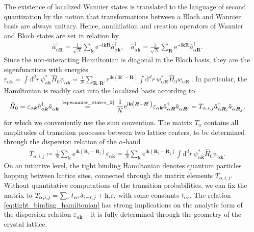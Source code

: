 \documentclass{svmono}
\def\ri{\mathrm i}
\def\re{\mathrm e}
\def\rd{\mathrm d}
\def\hc{{\rm h.c.}}
\def\pdag{{\vphantom\dag}}
\newcommand{\brlr}[1]{\left( #1 \right)}
\begin{document}
The existence of localized Wannier states is translated to the language of second quantization by the notion that transformations between a Bloch and Wannier basis are always unitary.
Hence, annihilation and creation operators of Wannier and Bloch states are set in relation by
\begin{align}
    \hat a^\dag_{\alpha{\bm R}} = \frac1{\sqrt N}\sum_{\bm k}\re^{-\ri{\bm k}{\bm R}}\hat a^\dag_{\alpha{\bm k}},
    \quad
    \hat a^\dag_{\alpha{\bm k}} = \frac1{\sqrt N}\sum_{\bm R}\re^{+\ri{\bm k}{\bm R}}\hat a^\dag_{\alpha{\bm R}}.
    \label{eq:wannier_states_2}
\end{align}
Since the non-interacting Hamiltonian is diagonal in the Bloch basis, they are the eigenfunctions with energies $\varepsilon_{\alpha{\bm k}} = \int\rd^dr\, \psi_{\alpha{\bm k}}^* \hat H_0 \psi_{\alpha{\bm k}} = \frac1N\sum_{\bm R,\bm R'}\re^{\ri\bm k(\bm R'-\bm R)}\int\rd^dr\, w_{\alpha{\bm R}}^* \hat H_0 w_{\alpha{\bm R'}}$.
In particular, the Hamiltonian is readily cast into the localized basis according to
\begin{align}
    \hat H_0
    =
    \varepsilon_{\alpha{\bm k}}\hat a^\dag_{\alpha{\bm k}}\hat a^\pdag_{\alpha{\bm k}}
    \overset{\text{\cref{eq:wannier_states_2}}}{=}
    \frac1N
    \re^{\ri{\bm k}\brlr{{\bm R}-{\bm R'}}}
    \varepsilon_{\alpha{\bm k}}
    \hat a^\dag_{\alpha{\bm R}}\hat a^\pdag_{\alpha{\bm R'}}
    =
    T_{\alpha,i,j}
    \hat a^\dag_{\alpha{\bm R}_i}\hat a^\pdag_{\alpha{\bm R}_j},
    \label{eq:tight_binding_hamiltonian}
\end{align}
for which we conveniently use the sum convention.
The matrix $T_{\alpha}$ contains all amplitudes of transition processes between two lattice centers, to be determined through the dispersion relation of the $\alpha$-band
\begin{align}
    T_{\alpha,i,j} \coloneqq \frac1N\sum_{\bm k}\re^{\ri{\bm k}\brlr{{\bm R}_i-{\bm R}_j}}\varepsilon_{\alpha{\bm k}} = \frac1N\sum_{\bm k}\re^{\ri{\bm k}\brlr{{\bm R}_i-{\bm R}_j}}\int\rd^dr\, \psi_{\alpha{\bm k}}^* \hat H_0 \psi_{\alpha{\bm k}}.
\end{align}
On an intuitive level, the tight binding Hamiltonian denotes quantum particles hopping between lattice sites, connected through the matrix elements $T_{\alpha,i,j}$.
Without quantitative computations of the transition probabilities, we can fix the matrix to $T_{\alpha,i,j}=\sum_rt_{\alpha r}\delta_{i-r,j} + \hc$ with some constants $t_{\alpha r}$.
The relation \cref{eq:tight_binding_hamiltonian} has strong implications on the analytic form of the dispersion relation $\varepsilon_{\alpha{\bm k}}$ -- it is fully determined through the geometry of the crystal lattice.
\end{document}
